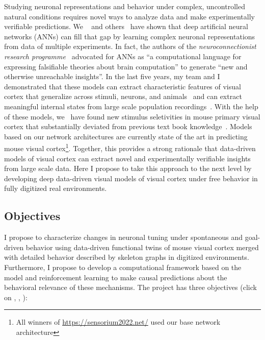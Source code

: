 \documentclass[COG,11pt]{ercgrant}
\begin{document}
Studying neuronal representations and behavior under complex, uncontrolled natural conditions requires novel ways to analyze data and make experimentally verifiable predictions. 
We ~\parencite{Walker2019-yw, Cobos2022-rr, Franke2022-do} and others~\parencite{Bashivan2019-ry, Ponce2019-yn, Hofling2022-wr} have shown that deep artificial neural networks (ANNs) can fill that gap by learning complex neuronal representations from data of multiple experiments.
In fact, the authors of the \textit{neuroconnectionist research programme}~\parencite{Doerig2022-ex} advocated for ANNs as ``a computational language for expressing falsifiable theories about brain computation'' to generate ``new and otherwise unreachable insights''. 
In the last five years, my team and I demonstrated that these models can extract characteristic features of visual cortex that generalize across stimuli, neurons, and animals~\parencite{Sinz2018-sk,Lurz2020-ua,Cobos2022-rr} and can extract meaningful internal states from large scale population recordings~\parencite{Bashiri2021-or}. 
With the help of these models, we~\parencite{Walker2019-yw} have found new stimulus seletivities in  mouse primary visual cortex that substantially deviated from previous text book knowledge~\parencite{Hubel1959-zs}.
Models based on our network architectures are currently state of the art in predicting mouse visual cortex\footnote{All winners of  \url{https://sensorium2022.net/} used our base network architecture}. 
Together, this provides a strong rationale that data-driven models of visual cortex can extract novel and experimentally verifiable insights from large scale data. 
Here I propose to take this approach to the next level by developing deep data-driven visual models of visual cortex under free behavior in fully digitized real environments. 


\subsection{Objectives}
I propose to characterize changes in neuronal tuning under spontaneous and goal-driven behavior using data-driven functional twins of mouse visual cortex merged with detailed behavior described by skeleton graphs in digitized environments.
Furthermore, I propose to develop a computational framework based on the model and reinforcement learning to make causal predictions about the behavioral relevance of these mechanisms. The project has three objectives (click on , , ):
\end{document}
